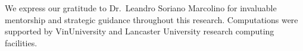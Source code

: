 \documentclass[sigconf]{acmart}
\begin{document}
\begin{acks}
We express our gratitude to Dr.~Leandro Soriano Marcolino for invaluable mentorship and strategic guidance throughout this research. Computations were supported by VinUniversity and Lancaster University research computing facilities.
\end{acks}



\end{document}
